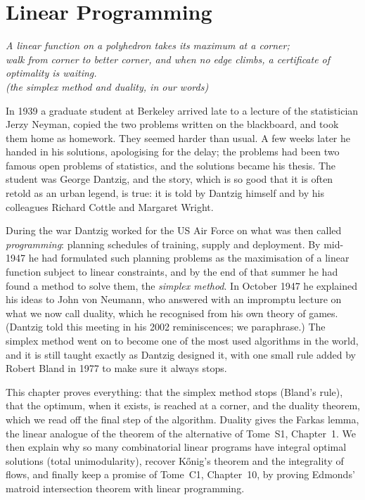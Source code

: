 \chapter{Linear Programming}\label{ch:lp}

\begin{center}\itshape
A linear function on a polyhedron takes its maximum at a corner;\\
walk from corner to better corner, and when no edge climbs, a certificate of optimality is waiting.\\
\upshape(the simplex method and duality, in our words)
\end{center}

In 1939 a graduate student at Berkeley arrived late to a lecture of the statistician Jerzy Neyman, copied the two problems written on the blackboard, and took them home as
homework. They seemed harder than usual. A few weeks later he handed in his solutions, apologising for the delay; the problems had been two famous open problems of statistics,
and the solutions became his thesis. The student was George Dantzig, and the story, which is so good that it is often retold as an urban legend, is true: it is told by
Dantzig himself and by his colleagues Richard Cottle and Margaret Wright.

During the war Dantzig worked for the US Air Force on what was then called \emph{programming}: planning schedules of training, supply and deployment. By mid-1947 he had
formulated such planning problems as the maximisation of a linear function subject to linear constraints, and by the end of that summer he had found a method to solve
them, the \emph{simplex method}. In October 1947 he explained his ideas to John von Neumann, who answered with an impromptu lecture on what we now call duality, which he
recognised from his own theory of games. (Dantzig told this meeting in his 2002 reminiscences; we paraphrase.) The simplex method went on to become one of the most used
algorithms in the world, and it is still taught exactly as Dantzig designed it, with one small rule added by Robert Bland in 1977 to make sure it always stops.

This chapter proves everything: that the simplex method stops (Bland's rule), that the optimum, when it exists, is reached at a corner, and the duality theorem, which
we read off the final step of the algorithm. Duality gives the Farkas lemma, the linear analogue of the theorem of the alternative of Tome~S1, Chapter~1. We then explain
why so many combinatorial linear programs have integral optimal solutions (total unimodularity), recover K\H onig's theorem and the integrality of flows, and finally keep
a promise of Tome~C1, Chapter~10, by proving Edmonds' matroid intersection theorem with linear programming.

